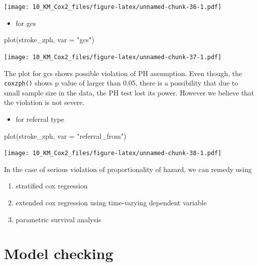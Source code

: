 \documentclass[
  10pt,
]{krantz}
\newenvironment{Shaded}{\begin{snugshade}}{\end{snugshade}}
\newcommand{\AttributeTok}[1]{\textcolor[rgb]{0.77,0.63,0.00}{#1}}
\newcommand{\FunctionTok}[1]{\textcolor[rgb]{0.00,0.00,0.00}{#1}}
\newcommand{\NormalTok}[1]{#1}
\newcommand{\StringTok}[1]{\textcolor[rgb]{0.31,0.60,0.02}{#1}}
\providecommand{\tightlist}{%
  \setlength{\itemsep}{0pt}\setlength{\parskip}{0pt}}
\begin{document}
\texttt{[image: 10\_KM\_Cox2\_files/figure-latex/unnamed-chunk-36-1.pdf]}

\begin{itemize}
\tightlist
\item
  for gcs
\end{itemize}

\begin{Shaded}
\begin{Highlighting}[]
\FunctionTok{plot}\NormalTok{(stroke\_zph, }\AttributeTok{var =} \StringTok{"gcs"}\NormalTok{)}
\end{Highlighting}
\end{Shaded}

\texttt{[image: 10\_KM\_Cox2\_files/figure-latex/unnamed-chunk-37-1.pdf]}

The plot for gcs shows possible violation of PH assumption. Even though, the \texttt{coxzph()} shows p value of larger than 0.05, there is a possibility that due to small sample size in the data, the PH test lost its power. However we believe that the violation is not severe.

\begin{itemize}
\tightlist
\item
  for referral type
\end{itemize}

\begin{Shaded}
\begin{Highlighting}[]
\FunctionTok{plot}\NormalTok{(stroke\_zph, }\AttributeTok{var =} \StringTok{"referral\_from"}\NormalTok{)}
\end{Highlighting}
\end{Shaded}

\texttt{[image: 10\_KM\_Cox2\_files/figure-latex/unnamed-chunk-38-1.pdf]}

In the case of serious violation of proportionality of hazard, we can remedy using

\begin{enumerate}
\def\labelenumi{\arabic{enumi}.}
\tightlist
\item
  stratified cox regression
\item
  extended cox regression using time-varying dependent variable
\item
  parametric survival analysis
\end{enumerate}

\hypertarget{model-checking}{%
\section{Model checking}\label{model-checking}}
\end{document}
